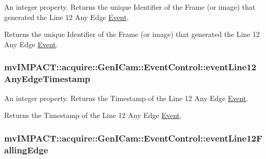 An integer property. Returns the unique Identifier of the Frame (or image) that generated the Line 12 Any Edge \hyperlink{classmv_i_m_p_a_c_t_1_1acquire_1_1_event}{Event}. 

Returns the unique Identifier of the Frame (or image) that generated the Line 12 Any Edge \hyperlink{classmv_i_m_p_a_c_t_1_1acquire_1_1_event}{Event}. \hypertarget{classmv_i_m_p_a_c_t_1_1acquire_1_1_gen_i_cam_1_1_event_control_adcb017795129dacda692baf3d95e7b63}{
\subsubsection[{event\+Line12\+Any\+Edge\+Timestamp}]{ mv\+I\+M\+P\+A\+C\+T\+::acquire\+::\+Gen\+I\+Cam\+::\+Event\+Control\+::event\+Line12\+Any\+Edge\+Timestamp}}\label{classmv_i_m_p_a_c_t_1_1acquire_1_1_gen_i_cam_1_1_event_control_adcb017795129dacda692baf3d95e7b63}


An integer property. Returns the Timestamp of the Line 12 Any Edge \hyperlink{classmv_i_m_p_a_c_t_1_1acquire_1_1_event}{Event}. 

Returns the Timestamp of the Line 12 Any Edge \hyperlink{classmv_i_m_p_a_c_t_1_1acquire_1_1_event}{Event}. \hypertarget{classmv_i_m_p_a_c_t_1_1acquire_1_1_gen_i_cam_1_1_event_control_a9320d4c7153df0c9e76a989bd07f9cbb}{
\subsubsection[{event\+Line12\+Falling\+Edge}]{ mv\+I\+M\+P\+A\+C\+T\+::acquire\+::\+Gen\+I\+Cam\+::\+Event\+Control\+::event\+Line12\+Falling\+Edge}}\label{classmv_i_m_p_a_c_t_1_1acquire_1_1_gen_i_cam_1_1_event_control_a9320d4c7153df0c9e76a989bd07f9cbb}


